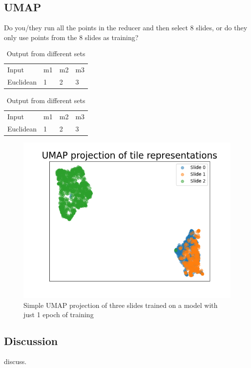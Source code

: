 \documentclass[10pt,twocolumn,letterpaper]{article}
\begin{document}
\subsection{UMAP}
Do you/they run all the points in the reducer and then select 8 slides, or do they only use points from the 8 slides as training?

\begin{table}
\centering
  \begin{tabular}{l l l l}
    Input & m1 & m2 & m3 \\
    Euclidean & 1 & 2 & 3 \\
  \end{tabular}
  \caption{Output from different sets}
  \label{tab:singleres}
\end{table}

\begin{table}
\centering
  \begin{tabular}{l l l l}
    Input & m1 & m2 & m3 \\
    Euclidean & 1 & 2 & 3 \\
  \end{tabular}
  \caption{Output from different sets}
  \label{tab:combinedres}
\end{table}

\begin{figure}
  \includegraphics[scale=.4]{./simple_umap_obvious.png}
  \caption{Simple UMAP projection of three slides trained on a model with just 1 epoch of training}
\label{fig:arbitrary}
\end{figure}



\subsection{Discussion}\label{sec:discussion}
discuss.

{\small


}
\end{document}
